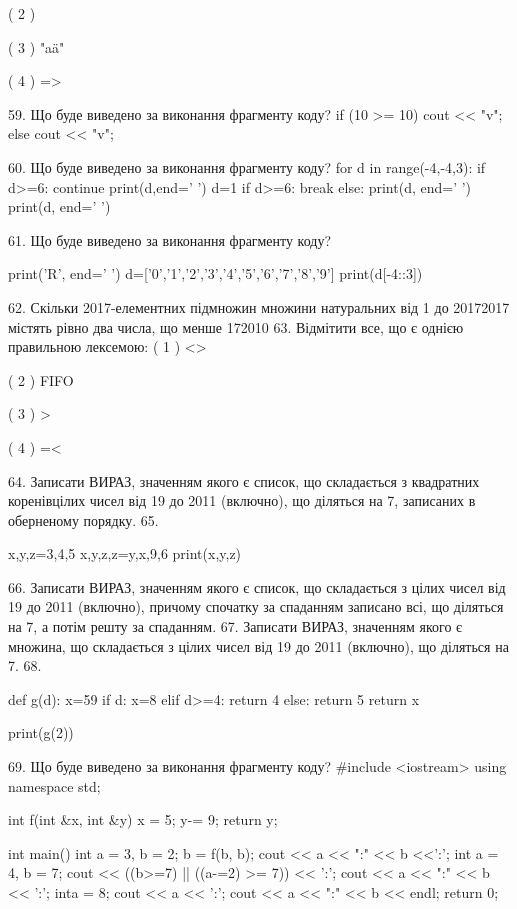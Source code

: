 \documentclass[11pt]{article}
\begin{document}
( 2 ) {

( 3 ) "a\"a"

( 4 ) =>

59. Що буде виведено за виконання фрагменту коду?
if (10 >= 10)
    cout << "v";
else
    cout << "v";


60. Що буде виведено за виконання фрагменту коду?
for d in range(-4,-4,3):
    if d>=6:
        continue
        print(d,end=' ')
        d=1
    if d>=6:
        break
else:
    print(d, end=' ')
print(d, end=' ')

61. Що буде виведено за виконання фрагменту коду?

print('R', end=' ')
d=['0','1','2','3','4','5','6','7','8','9']
print(d[-4::3])


62. 
Скільки 2017-елементних підмножин множини натуральних від 1 до 20172017 містять рівно два числа, що менше 172010
63. %
Відмітити все, що є однією правильною лексемою:
( 1 ) <>

( 2 ) FIFO

( 3 ) >

( 4 ) =<

64. 
Записати ВИРАЗ, значенням якого є список, що складається з квадратних коренівцілих чисел від 19 до 2011 (включно), що діляться на 7, записаних в оберненому порядку.
65. 

x,y,z=3,4,5
x,y,z,z=y,x,9,6
print(x,y,z)

66. 
Записати ВИРАЗ, значенням якого є список, що складається з цілих чисел від 19 до 2011 (включно), причому спочатку за спаданням записано всі, що діляться на 7, а потім решту за спаданням.
67. 
Записати ВИРАЗ, значенням якого є множина, що складається з цілих чисел від 19 до 2011 (включно), що діляться на 7.
68. 

def g(d):
    x=59
    if d: 
        x=8
    elif d>=4:
         return 4
    else:
         return 5
    return x

print(g(2))

69. Що буде виведено за виконання фрагменту коду?
#include <iostream>
using namespace std;

int f(int &x, int &y){
    x = 5;
    y-= 9;
    return y;
}

int main(){
    int a = 3, b = 2;
    b = f(b, b);
    cout << a << ":" << b <<':';
    {
        int a = 4, b = 7;
        cout << ((b>=7) || ((a-=2) >= 7)) << ':';
        cout << a << ":" << b << ':';
    }
    {
        inta = 8;
        cout << a << ':';
    }
    cout << a << ":" << b << endl;
    return 0;
}


}
\end{document}
